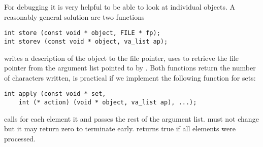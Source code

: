 For debugging it is very helpful to be able to look at individual objects. A
reasonably general solution are two functions
\begin{lstlisting}
int store (const void * object, FILE * fp);
int storev (const void * object, va_list ap);
\end{lstlisting}
 writes a description of the object to the file pointer,
 uses  to retrieve the file pointer from the
argument list pointed to by . Both functions return the number of
characters written,  is practical if we implement the
following function for sets:
\begin{lstlisting}
int apply (const void * set,
	int (* action) (void * object, va_list ap), ...);
\end{lstlisting}
 calls  for each element it  and
passes the rest of the argument list.  must not change
 but it may return zero to terminate  early.
 returns true if all elements were processed.

\iffalse


\begin{lstlisting}
#include<stdio.h>

/* A simple test file for input C code in \LaTeX.
 * The Hello_world.
 * */

"A quick brown fox jumps over the lazy dogs."
A quick brown fox jumps over the lazy dogs.

ABCDEFGHIJKLMNOPQRSTUVWXYZ_0123456789_abcdefghijklmnopqrstuvwxyz

012345678901234567890123456789012345678901234567890123456789--64
012345678901234567890123456789012345678901234567890123456789
01234567890123456789012345678901234567890123456789
0123456789012345678901234567890123456789

int main(int argc, char * argv[]){
	printf("Hello world!\n");
	// A quick brown fox jumps over the lazy dogs.
	return 0;
}
\end{lstlisting}
\fi


